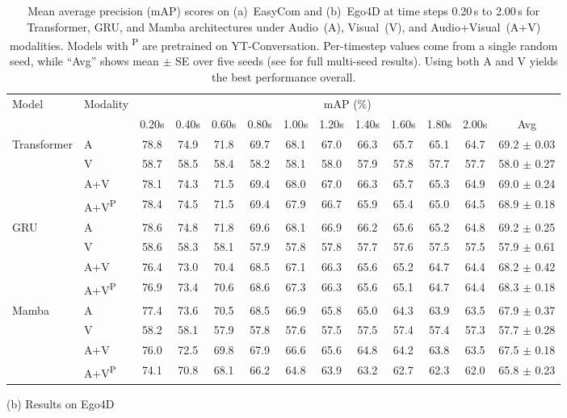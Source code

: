 \begin{table*}[t]
\begin{subtable}{\textwidth}
\centering
\begin{adjustbox}{width=\textwidth, center}
\begin{tabular}{llccccccccccc}
\toprule
\multirow{2}{*}{Model} & \multirow{2}{*}{Modality} & \multicolumn{11}{c}{mAP (\%)} \\
\cmidrule(lr){3-13}
 & & 0.20s & 0.40s & 0.60s & 0.80s & 1.00s & 1.20s & 1.40s & 1.60s & 1.80s & 2.00s & Avg \\
\midrule
\multirow{4}{*}{\centering Transformer} 
 & A & 78.8 & 74.9 & 71.8 & 69.7 & 68.1 & 67.0 & 66.3 & 65.7 & 65.1 & 64.7 & 69.2 $\pm$ 0.03
 \\
 & V & 58.7 & 58.5 & 58.4 & 58.2 & 58.1 & 58.0 & 57.9 & 57.8 & 57.7 & 57.7 & 58.0 $\pm$ 0.27
 \\
 & A+V & 78.1 & 74.3 & 71.5 & 69.4 & 68.0 & 67.0 & 66.3 & 65.7 & 65.3 & 64.9 & 69.0 $\pm$ 0.24
 \\
 & A+V\textsuperscript{P} & 78.4 & 74.5 & 71.5 & 69.4 & 67.9 & 66.7 & 65.9 & 65.4 & 65.0 & 64.5 & 68.9 $\pm$ 0.18
\\
\midrule
\multirow{4}{*}{\centering GRU} 
 & A & 78.6 & 74.8 & 71.8 & 69.6 & 68.1 & 66.9 & 66.2 & 65.6 & 65.2 & 64.8  & 69.2 $\pm$ 0.25
 \\
 & V & 58.6 & 58.3 & 58.1 & 57.9 & 57.8 & 57.8 & 57.7 & 57.6 & 57.5 & 57.5  & 57.9 $\pm$ 0.61
 \\
 & A+V & 76.4 & 73.0 & 70.4 & 68.5 & 67.1 & 66.3 & 65.6 & 65.2 & 64.7 & 64.4  & 68.2 $\pm$ 0.42
 \\
 & A+V\textsuperscript{P} & 76.9 & 73.4 & 70.6 & 68.6 & 67.3 & 66.3 & 65.6 & 65.1 & 64.7 & 64.4  & 68.3 $\pm$ 0.18
 \\
\midrule
\multirow{4}{*}{\centering Mamba} 
 & A & 77.4 & 73.6 & 70.5 & 68.5 & 66.9 & 65.8 & 65.0 & 64.3 & 63.9 & 63.5  & 67.9 $\pm$ 0.37
 \\
 & V & 58.2 & 58.1 & 57.9 & 57.8 & 57.6 & 57.5 & 57.5 & 57.4 & 57.4 & 57.3 & 57.7 $\pm$ 0.28
 \\
 & A+V & 76.0 & 72.5 & 69.8 & 67.9 & 66.6 & 65.6 & 64.8 & 64.2 & 63.8 & 63.5  & 67.5 $\pm$ 0.18
 \\
 & A+V\textsuperscript{P} & 74.1 & 70.8 & 68.1 & 66.2 & 64.8 & 63.9 & 63.2 & 62.7 & 62.3 & 62.0 & 65.8 $\pm$ 0.23
 \\
\bottomrule
\end{tabular}
\end{adjustbox}
\label{tab:main_result_b}
\caption*{(b) Results on Ego4D} 
\end{subtable}

\caption{Mean average precision (mAP) scores on (a)~EasyCom and (b)~Ego4D at time steps 0.20\,s to 2.00\,s for Transformer, GRU, and Mamba architectures under Audio~(A), Visual~(V), and Audio+Visual~(A+V) modalities. Models with \textsuperscript{P} are pretrained on YT-Conversation. Per-timestep values come from a single random seed, while ``Avg'' shows mean $\pm$ SE over five seeds (see  for full multi-seed results). Using both A and V yields the best performance overall.}




\label{tab:main_result}
\end{table*}












